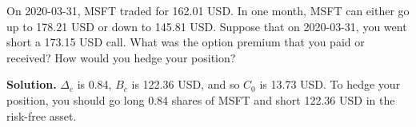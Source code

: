 \noindent On 2020-03-31, MSFT traded for 162.01 USD. In one month, MSFT can either go up to 178.21 USD or down to 145.81 USD. Suppose that on 2020-03-31, you went short a 173.15 USD call. What was the option premium that you paid or received? How would you hedge your position?

\vspace{9pt}

\noindent\textbf{Solution.} $\Delta_{c}$ is 0.84, $B_{c}$ is 122.36 USD, and so $C_{0}$ is 13.73 USD. To hedge your position, you should go long 0.84 shares of MSFT and short 122.36 USD in the risk-free asset.